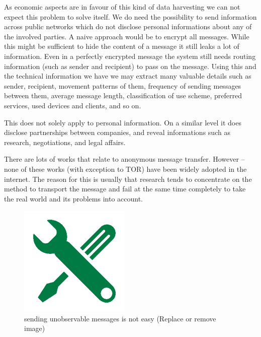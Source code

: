 \documentclass[12pt,journal,compsoc]{IEEEtran}
\begin{document}
As economic aspects are in favour of this kind of data harvesting we can not expect this problem to solve itself. We do need the possibility to send information across public networks which do not disclose personal informations about any of the involved parties. A naive approach would be to encrypt all messages. While this might be sufficient to hide the content of a message it still leaks a lot of information. Even in a perfectly encrypted message the system still needs routing information (such as sender and recipient) to pass on the message. Using this and the technical information we have we may extract many valuable details such as sender, recipient, movement patterns of them, frequency of sending messages between them, average message length, classification of use scheme, preferred services, used devices and clients, and so on.\par
This does not solely apply to personal information. On a similar level it does disclose partnerships between companies, and reveal informations such as research, negotiations, and legal affairs.
\par
There are lots of works\cite{tor-design}\cite{mixmaster-spec}\cite{xor-trees}\cite{Levine:2002}\cite{chaum-mix} that relate to anonymous message transfer. However -- none of these works (with exception to TOR\cite{tor-design}) have been widely adopted in the internet. The reason for this is usually that research tends to concentrate on the method to transport the message and fail at the same time completely to take the real world and its problems into account. 

\begin{figure}
	\includegraphics[width=0.9\linewidth]{../inc/fixme}
	\caption{sending unobservable messages is not easy (Replace or remove image)}
\end{figure}
\end{document}
